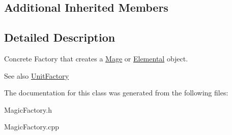 \subsection*{Additional Inherited Members}


\subsection{Detailed Description}
Concrete Factory that creates a \hyperlink{class_mage}{Mage} or \hyperlink{class_elemental}{Elemental} object. 

\begin{DoxySeeAlso}{See also}
\hyperlink{class_unit_factory}{Unit\+Factory} 
\end{DoxySeeAlso}


The documentation for this class was generated from the following files\+:\begin{DoxyCompactItemize}
\item 
Magic\+Factory.\+h\item 
Magic\+Factory.\+cpp\end{DoxyCompactItemize}
